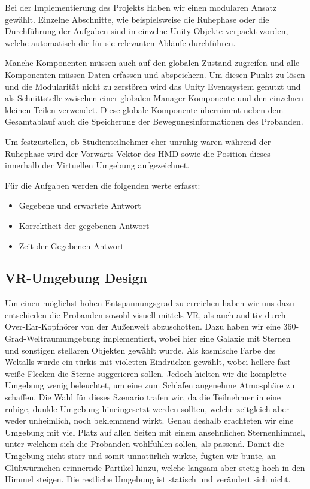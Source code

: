 Bei der Implementierung des Projekts Haben wir einen modularen Ansatz gewählt. Einzelne Abschnitte, wie beispielsweise die Ruhephase oder die Durchführung der Aufgaben sind in einzelne Unity-Objekte verpackt worden, welche automatisch die für sie relevanten Abläufe durchführen. 

Manche Komponenten müssen auch auf den globalen Zustand zugreifen und alle Komponenten müssen Daten erfassen und abspeichern. Um diesen Punkt zu lösen und die Modularität nicht zu zerstören wird das Unity Eventsystem genutzt und als Schnittstelle zwischen einer globalen Manager-Komponente und den einzelnen kleinen Teilen verwendet. 
Diese globale Komponente übernimmt neben dem Gesamtablauf auch die Speicherung der Bewegungsinformationen des Probanden. 

Um festzustellen, ob Studienteilnehmer eher unruhig waren während der Ruhephase wird der Vorwärts-Vektor des HMD sowie die Position dieses innerhalb der Virtuellen Umgebung aufgezeichnet.

Für die Aufgaben werden die folgenden werte erfasst:
\begin{itemize}
    \item Gegebene und erwartete Antwort
    \item Korrektheit der gegebenen Antwort
    \item Zeit der Gegebenen Antwort
\end{itemize}

\subsection{VR-Umgebung Design}

Um einen möglichst hohen Entspannungsgrad zu erreichen haben wir uns dazu entschieden die Probanden sowohl visuell mittels VR, als auch auditiv durch Over-Ear-Kopfhörer von der Außenwelt abzuschotten. Dazu haben wir eine 360-Grad-Weltraumumgebung implementiert, wobei hier eine Galaxie mit Sternen und sonstigen stellaren Objekten gewählt wurde. Als kosmische Farbe des Weltalls wurde ein türkis mit violetten Eindrücken gewählt, wobei hellere fast weiße Flecken die Sterne suggerieren sollen. Jedoch hielten wir die komplette Umgebung wenig beleuchtet, um eine zum Schlafen angenehme Atmosphäre zu schaffen. Die Wahl für dieses Szenario trafen wir, da die Teilnehmer in eine ruhige, dunkle Umgebung hineingesetzt werden sollten, welche zeitgleich aber weder unheimlich, noch beklemmend wirkt. Genau deshalb erachteten wir eine Umgebung mit viel Platz auf allen Seiten mit einem ansehnlichen Sternenhimmel, unter welchem sich die Probanden wohlfühlen sollen, als passend. Damit die Umgebung nicht starr und somit unnatürlich wirkte, fügten wir bunte, an Glühwürmchen erinnernde Partikel hinzu, welche langsam aber stetig hoch in den Himmel steigen. Die restliche Umgebung ist statisch und verändert sich nicht.

